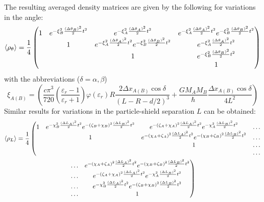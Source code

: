 The resulting averaged density matrices are given by the following for variations in the angle:
\begin{equation}
  \left\langle\rho_{\theta}\right\rangle = \frac{1}{4}\begin{pmatrix}
    1 & e^{-\xi_B^2\frac{(\Delta \theta_B)^2}{2}t^2} & e^{-\xi_A^2\frac{(\Delta \theta_A)^2}{2}t^2} & e^{-\xi_A^2\frac{(\Delta \theta_A)^2}{2}t^2}e^{-\xi_B^2\frac{(\Delta \theta_B)^2}{2}t^2}\\
    & 1 & e^{-\xi_A^2\frac{(\Delta \theta_A)^2}{2}t^2}e^{-\xi_B^2\frac{(\Delta \theta_B)^2}{2}t^2} & e^{-\xi_A^2\frac{(\Delta \theta_A)^2}{2}t^2}\\
    & & 1 & e^{-\xi_B^2\frac{(\Delta \theta_B)^2}{2}t^2}\\
    & & & 1
  \end{pmatrix}
\end{equation}
with the abbreviations ($\delta = \alpha,\beta$)
\begin{equation}\label{eq:apx:definition-xi}
  \xi_{A(B)} = \left(\frac{c \pi^3}{720} \left(\frac{\varepsilon_r - 1}{\varepsilon_r + 1}\right)\varphi(\varepsilon_r) R \frac{2\Delta x_{A(B)} \cos\delta}{(L-R-d/2)^3} + \frac{G M_A M_B}{\hbar} \frac{\Delta x_{A(B)} \cos\delta}{4L^2}\right)
\end{equation}
Similar results for variations in the particle-shield separation $L$ can be obtained:
\begin{multline}
  \left\langle\rho_{L}\right\rangle = \frac{1}{4}\left(\begin{matrix}
    1 & e^{-\chi_B^2\frac{(\Delta L_A)^2}{2}t^2}e^{-(\zeta_B + \chi_B)^2\frac{(\Delta L_B)^2}{2}t^2} & e^{-(\zeta_A+\chi_A)^2\frac{(\Delta L_A)^2}{2}t^2}e^{-\chi_A^2\frac{(\Delta L_B)^2}{2}t^2} & \dots \\
    & 1 & e^{-(\chi_A+\zeta_A)^2\frac{(\Delta L_A)^2}{2}t^2}e^{-(\chi_B+\zeta_B)^2\frac{(\Delta L_B)^2}{2}t^2} & \dots\\
    & & 1 & \dots\\
    & & & \dots
  \end{matrix}\right. \\
  \left.\begin{matrix}
    \dots & e^{-(\chi_A+\zeta_A)^2\frac{(\Delta L_A)^2}{2}t^2}e^{-(\chi_B+\zeta_B)^2\frac{(\Delta L_B)^2}{2}t^2} \\
    \dots & e^{-(\zeta_A+\chi_A)^2\frac{(\Delta L_A)^2}{2}t^2}e^{-\chi_A^2\frac{(\Delta L_B)^2}{2}t^2} \\
    \dots & e^{-\chi_B^2\frac{(\Delta L_A)^2}{2}t^2}e^{-(\zeta_B + \chi_B)^2\frac{(\Delta L_B)^2}{2}t^2} \\
    \dots & 1
  \end{matrix}\right)
\end{multline}
